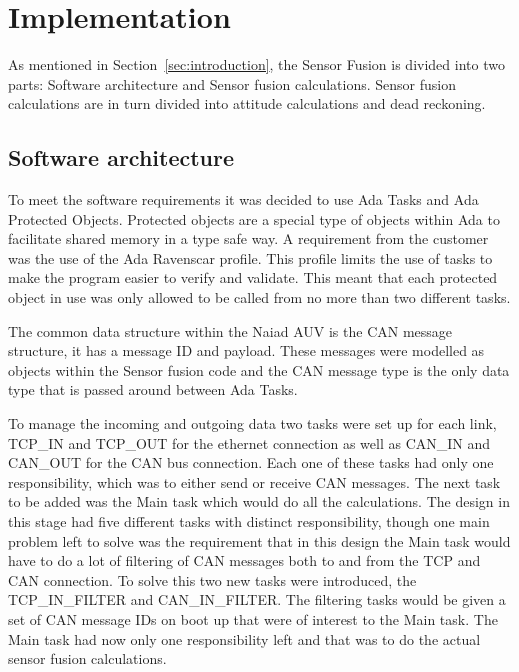 \pagebreak
\section{Implementation}\label{sec:implementation}
As mentioned in Section~\ref{sec:introduction}, the Sensor Fusion is divided into two parts: Software architecture and Sensor fusion calculations. Sensor fusion calculations are in turn divided into attitude
calculations and dead reckoning.

\subsection{Software architecture}
To meet the software requirements it was decided to use Ada Tasks and Ada
Protected Objects. Protected objects are a special type of objects within Ada
to facilitate shared memory in a type safe way. A requirement from the
customer was the use of the Ada Ravenscar profile. This profile limits
the use of tasks to make the program easier to verify and validate. This meant
that each protected object in use was only allowed to be called from no more than two
different tasks.

The common data structure within the Naiad AUV is the CAN message structure,
it has a message ID and payload. These messages were modelled as objects within
the Sensor fusion code and the CAN message type is the only data type that
is passed around between Ada Tasks.

To manage the incoming and outgoing data two tasks were set up for each link,
TCP\_IN and TCP\_OUT for the ethernet connection as well as CAN\_IN and CAN\_OUT for
the CAN bus connection. Each one of these tasks had only one responsibility, which
was to either send or receive CAN messages.
The next task to be added was the Main
task which would do all the calculations. The design in this stage had five
different tasks with distinct responsibility, though one main problem left to solve
was the requirement that in this design the Main task would have to do a lot of
filtering of CAN messages both to and from the TCP and CAN connection. To solve this
two new tasks were introduced, the TCP\_IN\_FILTER and CAN\_IN\_FILTER. The filtering
tasks would be given a set of CAN message IDs on boot up that were of interest to
the Main task. The Main task had now only one responsibility left and that was
to do the actual sensor fusion calculations.

